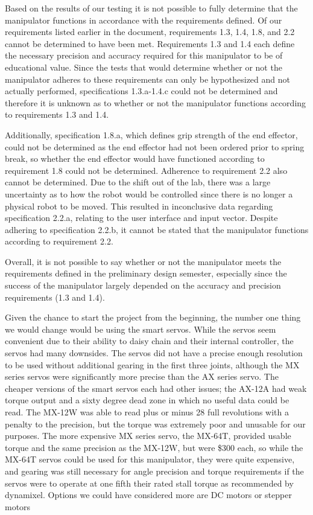 
Based on the results of our testing it is not possible to fully determine that the manipulator functions in accordance with the requirements defined. Of our requirements listed earlier in the document, requirements 1.3, 1.4, 1.8, and 2.2 cannot be determined to have been met. Requirements 1.3 and 1.4 each define the necessary precision and accuracy required for this manipulator to be of educational value. Since the tests that would determine whether or not the manipulator adheres to these requirements can only be hypothesized and not actually performed, specifications 1.3.a-1.4.c could not be determined and therefore it is unknown as to whether or not the manipulator functions according to requirements 1.3 and 1.4.

Additionally, specification 1.8.a, which defines grip strength of the end effector, could not be determined as the end effector had not been ordered prior to spring break, so whether the end effector would have functioned according to requirement 1.8 could not be determined. Adherence to requirement 2.2 also cannot be determined. Due to the shift out of the lab, there was a large uncertainty as to how the robot would be controlled since there is no longer a physical robot to be moved. This resulted in inconclusive data regarding specification 2.2.a, relating to the user interface and input vector. Despite adhering to specification 2.2.b, it cannot be stated that the manipulator functions according to requirement 2.2.

Overall, it is not possible to say whether or not the manipulator meets the requirements defined in the preliminary design semester, especially since the success of the manipulator largely depended on the accuracy and precision requirements (1.3 and 1.4).

Given the chance to start the project from the beginning, the number one thing we would change would be using the smart servos. While the servos seem convenient due to their ability to daisy chain and their internal controller, the servos had many downsides. The servos did not have a precise enough resolution to be used without additional gearing in the first three joints, although the MX series servos were significantly more precise than the AX series servo. The cheaper versions of the smart servos each had other issues; the AX-12A had weak torque output and a sixty degree dead zone in which no useful data could be read. The MX-12W was able to read plus or minus 28 full revolutions with a penalty to the precision, but the torque was extremely poor and unusable for our purposes. The more expensive MX series servo, the MX-64T, provided usable torque and the same precision as the MX-12W, but were \$300 each, so while the MX-64T servos could be used for this manipulator, they were quite expensive, and gearing was still necessary for angle precision and torque requirements if the servos were to operate at one fifth their rated stall torque as recommended by dynamixel. Options we could have considered more are DC motors or stepper motors

